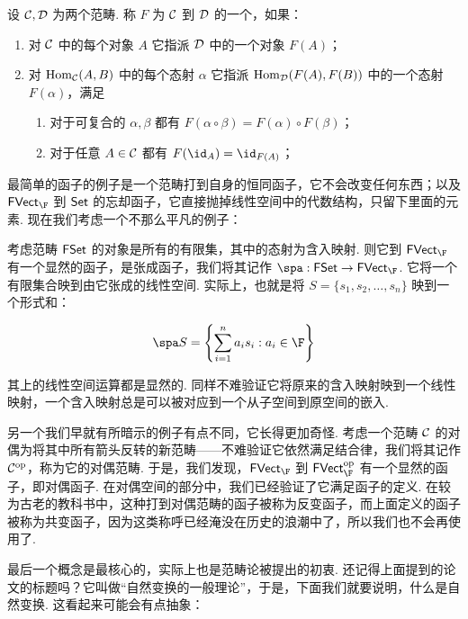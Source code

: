 \begin{definition}{}{}
    设 $\mathcal{C}, \mathcal{D}$ 为两个范畴. 称 $F$ 为 $\mathcal{C}$ 到 $\mathcal{D}$ 的一个，如果：
    \begin{enumerate}
        \item 对 $\mathcal{C}$ 中的每个对象 $A$ 它指派 $\mathcal{D}$ 中的一个对象 $F(A)$；
        \item 对 $\operatorname{Hom}_{\mathcal{C}} (A, B)$ 中的每个态射 $\alpha$ 它指派 $\operatorname{Hom}_{\mathcal{D}} (F(A), F(B))$ 中的一个态射 $F(\alpha)$，满足
              \begin{enumerate}
                  \item 对于可复合的 $\alpha, \beta$ 都有 $F(\alpha \circ \beta) = F(\alpha) \circ F(\beta)$；
                  \item 对于任意 $A \in \mathcal{C}$ 都有 $F(\id_A) = \id_{F(A)}$；
              \end{enumerate}
    \end{enumerate}
\end{definition}

最简单的函子的例子是一个范畴打到自身的恒同函子，它不会改变任何东西；以及 $\FVect_\F$ 到 $\mathsf{Set}$ 的忘却函子，它直接抛掉线性空间中的代数结构，只留下里面的元素. 现在我们考虑一个不那么平凡的例子：

\begin{example}{}{}
    考虑范畴 $\mathsf{FSet}$ 的对象是所有的有限集，其中的态射为含入映射. 则它到 $\FVect_\F$ 有一个显然的函子，是张成函子，我们将其记作 $\spa: \FSet \to \FVect_\F$. 它将一个有限集合映到由它张成的线性空间. 实际上，也就是将 $S = \{s_1, s_2,\ldots, s_n\}$ 映到一个形式和：

    \[
        \spa S = \left\{\sum_{i = 1}^n a_i s_i: a_i \in \F\right\}
    \]

    其上的线性空间运算都是显然的. 同样不难验证它将原来的含入映射映到一个线性映射，一个含入映射总是可以被对应到一个从子空间到原空间的嵌入.
\end{example}

另一个我们早就有所暗示的例子有点不同，它长得更加奇怪. 考虑一个范畴 $\mathcal{C}$ 的对偶为将其中所有箭头反转的新范畴——不难验证它依然满足结合律，我们将其记作 $\mathcal{C}^\mathrm{op}$，称为它的对偶范畴. 于是，我们发现，$\FVect_\F$ 到 $\FVect_\F^\mathrm{op}$ 有一个显然的函子，即对偶函子. 在对偶空间的部分中，我们已经验证了它满足函子的定义. 在较为古老的教科书中，这种打到对偶范畴的函子被称为反变函子，而上面定义的函子被称为共变函子，因为这类称呼已经淹没在历史的浪潮中了，所以我们也不会再使用了.

最后一个概念是最核心的，实际上也是范畴论被提出的初衷. 还记得上面提到的论文的标题吗？它叫做``自然变换的一般理论''，于是，下面我们就要说明，什么是自然变换. 这看起来可能会有点抽象：

